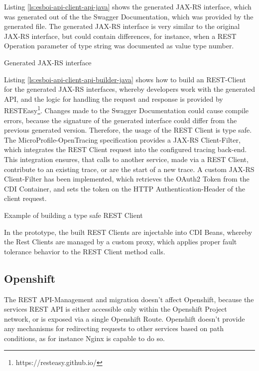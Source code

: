Listing \vref{ls:esboi-api-client-api-java} shows the generated JAX-RS interface, which was generated out of the the Swagger Documentation, which was provided by the generated  file. The generated JAX-RS interface is very similar to the original JAX-RS interface, but could contain differences, for instance, when a REST Operation parameter of type string was documented as value type number.

\begin{listing}[h]
	\caption{Generated JAX-RS interface}
	\label{ls:esboi-api-client-api-java}
\end{listing}

Listing \vref{ls:esboi-api-client-api-builder-java} shows how to build an REST-Client for the generated JAX-RS interfaces, whereby developers work with the generated API, and the logic for handling the request and response is provided by RESTEasy\footnote{https://resteasy.github.io/}. Changes made to the Swagger Documentation could cause compile errors, because the signature of the generated interface could differ from the previous generated version. Therefore, the usage of the REST Client is type safe. The MicroProfile-OpenTracing specification provides a JAX-RS Client-Filter, which integrates the REST Client request into the configured tracing back-end. This integration ensures, that calls to another service, made via a REST Client, contribute to an existing trace, or are the start of a new trace. A custom JAX-RS Client-Filter has been implemented, which retrieves the OAuth2 Token from the CDI Container, and sets the token on the HTTP Authentication-Header of the client request.

\begin{listing}[h]
	\caption{Example of building a type safe REST Client}
	\label{ls:esboi-api-client-api-builder-java}
\end{listing}

In the prototype, the built REST Clients are injectable into CDI Beans, whereby the Rest Clients are managed by a custom proxy, which applies proper fault tolerance behavior to the REST Client method calls.

\subsection{Openshift}
\label{sec:esbi-api-openshift}
The REST API-Management and migration doesn't affect Openshift, because the services REST API is either accessible only within the Openshift Project network, or is exposed via a single Openshift Route. Openshift doesn't provide any mechanisms for redirecting requests to other services based on path conditions, as for instance Nginx is capable to do so. 

